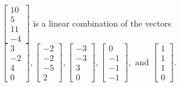 \begin{exercise}
\begin{exerciseStatement}
  \end{exerciseStatement}
  \begin{exerciseAnswer}
   \(\left[\begin{array}{c}
10 \\
5 \\
11 \\
-4
\end{array}\right]\) 
  	 is  
	a linear combination of the vectors \(\left[\begin{array}{c}
3 \\
-2 \\
4 \\
0
\end{array}\right] , \left[\begin{array}{c}
-2 \\
-2 \\
-5 \\
2
\end{array}\right] , \left[\begin{array}{c}
-3 \\
-3 \\
3 \\
0
\end{array}\right] , \left[\begin{array}{c}
0 \\
-1 \\
-1 \\
-1
\end{array}\right] , \text{ and } \left[\begin{array}{c}
1 \\
1 \\
1 \\
0
\end{array}\right]\).

	
  


  \end{exerciseAnswer}
\end{exercise}